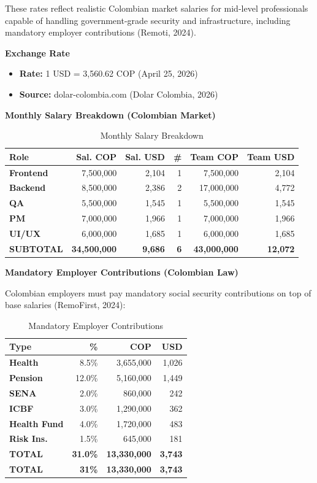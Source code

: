 \documentclass[12pt,a4paper]{article}
\begin{document}
These rates reflect realistic Colombian market salaries for mid-level professionals capable of handling government-grade security and infrastructure, including mandatory employer contributions (Remoti, 2024).

\textbf{Exchange Rate}
\begin{itemize}
    \item \textbf{Rate:} 1 USD = 3,560.62 COP (April 25, 2026)
    \item \textbf{Source:} dolar-colombia.com (Dolar Colombia, 2026)
\end{itemize}

\textbf{Monthly Salary Breakdown (Colombian Market)}

\begin{table}[h]
\centering
\caption{Monthly Salary Breakdown}
\label{tab:salaries}
\small
\begin{tabular}{|l|r|r|r|r|r|}
\hline
\textbf{Role} & \textbf{Sal. COP} & \textbf{Sal. USD} & \textbf{\#} & \textbf{Team COP} & \textbf{Team USD} \\
\hline
\textbf{Frontend} & 7,500,000 & 2,104 & 1 & 7,500,000 & 2,104 \\
\textbf{Backend} & 8,500,000 & 2,386 & 2 & 17,000,000 & 4,772 \\
\textbf{QA} & 5,500,000 & 1,545 & 1 & 5,500,000 & 1,545 \\
\textbf{PM} & 7,000,000 & 1,966 & 1 & 7,000,000 & 1,966 \\
\textbf{UI/UX} & 6,000,000 & 1,685 & 1 & 6,000,000 & 1,685 \\
\textbf{SUBTOTAL} & \textbf{34,500,000} & \textbf{9,686} & \textbf{6} & \textbf{43,000,000} & \textbf{12,072} \\
\hline
\end{tabular}
\end{table}

\textbf{Mandatory Employer Contributions (Colombian Law)}

Colombian employers must pay mandatory social security contributions on top of base salaries (RemoFirst, 2024):

\begin{table}[h]
\centering
\caption{Mandatory Employer Contributions}
\label{tab:contributions}
\begin{tabular}{|l|r|r|r|}
\hline
\textbf{Type} & \textbf{\%} & \textbf{COP} & \textbf{USD} \\ \hline
\textbf{Health} & 8.5\% & 3,655,000 & 1,026 \\
\textbf{Pension} & 12.0\% & 5,160,000 & 1,449 \\
\textbf{SENA} & 2.0\% & 860,000 & 242 \\
\textbf{ICBF} & 3.0\% & 1,290,000 & 362 \\
\textbf{Health Fund} & 4.0\% & 1,720,000 & 483 \\
\textbf{Risk Ins.} & 1.5\% & 645,000 & 181 \\
\textbf{TOTAL} & \textbf{31.0\%} & \textbf{13,330,000} & \textbf{3,743} \\
\textbf{TOTAL}& \textbf{31\%} & \textbf{13,330,000} & \textbf{3,743} \\ \hline
\end{tabular}
\end{table}
\end{document}
